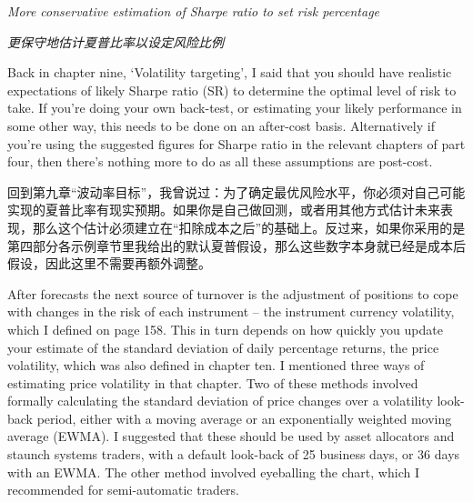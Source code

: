 \smallskip \noindent\textit{More conservative estimation of Sharpe ratio to set risk percentage}

\smallskip \noindent\textit{更保守地估计夏普比率以设定风险比例}




\begin{englishblock} Back in chapter nine, ‘Volatility targeting', I said that you should have realistic expectations of likely Sharpe ratio (SR) to determine the optimal level of risk to take. If you're doing your own back-test, or estimating your likely performance in some other way, this needs to be done on an after-cost basis. Alternatively if you're using the suggested figures for Sharpe ratio in the relevant chapters of part four, then there's nothing more to do as all these assumptions are post-cost. \end{englishblock}

\begin{chineseblock}回到第九章“波动率目标”，我曾说过：为了确定最优风险水平，你必须对自己可能实现的夏普比率有现实预期。如果你是自己做回测，或者用其他方式估计未来表现，那么这个估计必须建立在“扣除成本之后”的基础上。反过来，如果你采用的是第四部分各示例章节里我给出的默认夏普假设，那么这些数字本身就已经是成本后假设，因此这里不需要再额外调整。\end{chineseblock}

\bipairgap

\begin{englishblock} After forecasts the next source of turnover is the adjustment of positions to cope with changes in the risk of each instrument -- the instrument currency volatility, which I defined on page 158. This in turn depends on how quickly you update your estimate of the standard deviation of daily percentage returns, the price volatility, which was also defined in chapter ten. I mentioned three ways of estimating price volatility in that chapter. Two of these methods involved formally calculating the standard deviation of price changes over a volatility look-back period, either with a moving average or an exponentially weighted moving average (EWMA). I suggested that these should be used by asset allocators and staunch systems traders, with a default look-back of 25 business days, or 36 days with an EWMA. The other method involved eyeballing the chart, which I recommended for semi-automatic traders. \end{englishblock}

